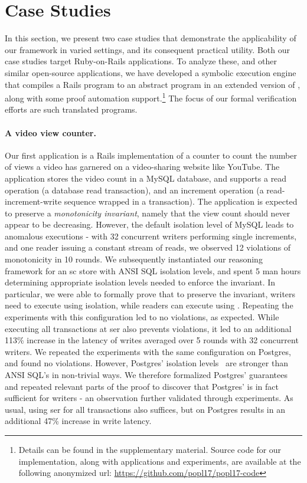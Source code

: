 \section{Case Studies}
\label{sec:case-studies}

In this section, we present two case studies that demonstrate the
applicability of our framework in varied settings, and its consequent
practical utility. Both our case studies target Ruby-on-Rails
applications. To analyze these, and other similar open-source
applications, we have developed a symbolic execution engine that
compiles a Rails program to an abstract program in an extended version
of \txnimp, along with some proof automation support.\footnote{Details
   can be found in the supplementary material.  Source code for our
  implementation, along with applications and experiments, are
  available at the following anonymized url:
  \url{https://github.com/popl17/popl17-code}} The focus of
our formal verification efforts are such translated \txnimp programs.

\paragraph{A video view counter.} Our first application is a Rails
implementation of a counter to count the number of views a video has
garnered on a video-sharing website like YouTube. The application
stores the video count in a MySQL database, and supports a read
operation (a database read transaction), and an increment operation (a
read-increment-write sequence wrapped in a transaction).  The
application is expected to preserve a \emph{monotonicity invariant},
namely that the view count should never appear to be decreasing.
However, the default  isolation level of MySQL
leads to anomalous executions - with 32 concurrent writers performing
single increments, and one reader issuing a constant stream of reads,
we observed 12 violations of monotonicity in 10 rounds. We
subsequently instantiated our reasoning framework for an {\sc sc}
store with ANSI SQL isolation levels, and spent 5 man hours
determining appropriate isolation levels needed to enforce the
invariant. In particular, we were able to formally prove that to
preserve the invariant, writers need to execute using
 isolation, while readers can execute using
. Repeating the experiments with this
configuration led to no violations, as expected. While executing all
transactions at {\sc ser} also prevents violations, it led to an
additional 113\% increase in the latency of writes averaged over 5
rounds with 32 concurrent writers.  We repeated the experiments with
the same configuration on Postgres, and found no violations. However,
Postgres' isolation levels~\cite{postgresiso} are stronger than ANSI
SQL's in non-trivial ways. We therefore formalized Postgres'
guarantees and repeated relevant parts of the proof to discover that
Postgres'  is in fact sufficient for writers - an
observation further validated through experiments. As usual, using
{\sc ser} for all transactions also suffices, but on Postgres results
in an additional 47\% increase in write latency.

